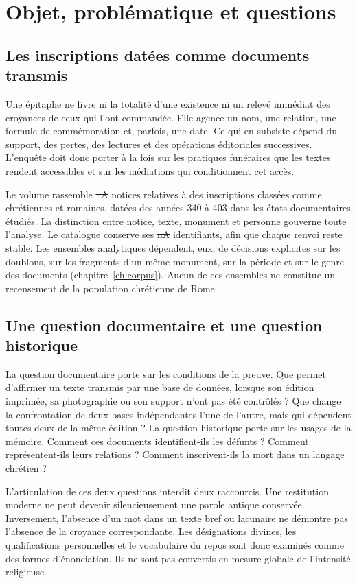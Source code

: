 \chapter{Objet, problématique et questions}\label{ch:objet}

\section{Les inscriptions datées comme documents transmis}

Une épitaphe ne livre ni la totalité d’une existence ni un relevé immédiat des croyances de ceux qui l’ont commandée. Elle agence un nom, une relation, une formule de commémoration et, parfois, une date. Ce qui en subsiste dépend du support, des pertes, des lectures et des opérations éditoriales successives. L’enquête doit donc porter à la fois sur les pratiques funéraires que les textes rendent accessibles et sur les médiations qui conditionnent cet accès.

Le volume rassemble \st{nA} notices relatives à des inscriptions classées comme chrétiennes et romaines, datées des années 340 à 403 dans les états documentaires étudiés. La distinction entre notice, texte, monument et personne gouverne toute l’analyse. Le catalogue conserve ses \st{nA} identifiants, afin que chaque renvoi reste stable. Les ensembles analytiques dépendent, eux, de décisions explicites sur les doublons, sur les fragments d’un même monument, sur la période et sur le genre des documents (chapitre~\ref{ch:corpus}). Aucun de ces ensembles ne constitue un recensement de la population chrétienne de Rome.

\section{Une question documentaire et une question historique}

La question documentaire porte sur les conditions de la preuve. Que permet d’affirmer un texte transmis par une base de données, lorsque son édition imprimée, sa photographie ou son support n’ont pas été contrôlés ? Que change la confrontation de deux bases indépendantes l’une de l’autre, mais qui dépendent toutes deux de la même édition ? La question historique porte sur les usages de la mémoire. Comment ces documents identifient-ils les défunts ? Comment représentent-ils leurs relations ? Comment inscrivent-ils la mort dans un langage chrétien ?

L’articulation de ces deux questions interdit deux raccourcis. Une restitution moderne ne peut devenir silencieusement une parole antique conservée. Inversement, l’absence d’un mot dans un texte bref ou lacunaire ne démontre pas l’absence de la croyance correspondante. Les désignations divines, les qualifications personnelles et le vocabulaire du repos sont donc examinés comme des formes d’énonciation. Ils ne sont pas convertis en mesure globale de l’intensité religieuse.

